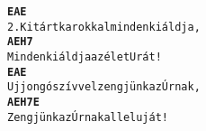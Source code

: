 \begin{minipage}{\textwidth}
\kottastart
{}
\kottaend
\begin{minipage}{\textwidth}
\begin{multicols}{2}
\begin{minipage}{\textwidth}
\begin{alltt}
\textbf{   E                A       E}
2. Kitárt karokkal mindenki áldja,
\textbf{    A       E        H7}
   Mindenki áldja az élet Urát!
\textbf{   E                A          E}
   Ujjongó szívvel zengjünk az Úrnak,
\textbf{    A          E     H7     E}
   Zengjünk az Úrnak alleluját!
\end{alltt}
\vspace{0.0cm}
\versszakspacing
\end{minipage}
\vspace{0.2cm}
\end{multicols}
\end{minipage}

\end{minipage}
~\vspace{1.0cm}
\newline
